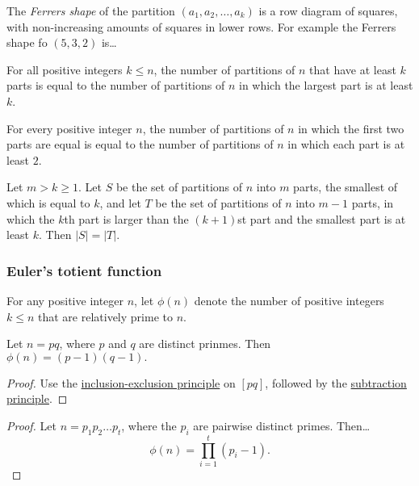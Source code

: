 The \emph{Ferrers shape} of the partition $(a_1,a_2,\dots,a_k)$ is a row diagram of squares, with non-increasing amounts of squares in lower rows. For example the Ferrers shape fo $(5,3,2)$ is\dots\newline



\begin{proposition}
For all positive integers $k \leq n$, the number of partitions of $n$ that have at least $k$ parts is equal to the number
of partitions of $n$ in which the largest part is at least $k$.
\end{proposition}

\begin{proposition}
For every positive integer $n$, the number of partitions of $n$ in which the first two parts are equal is equal to the number of partitions of $n$ 
in which each part is at least $2$.
\end{proposition}

\begin{lemma}
Let $m > k \geq 1$. Let $S$ be the set of partitions of $n$ into $m$ parts, the smallest of which is equal to $k$, and let $T$ be the set of partitions of 
$n$ into $m-1$ parts, in which the $k$th part is larger than the $(k+1)$st part and the smallest part is at least $k$.
Then $|S| = |T|$.
\end{lemma}

\subsubsection{Euler's totient function}\label{combinatoricstotient}

For any positive integer $n$, let $\phi(n)$ denote the number of positive integers $k \leq n$ that are relatively prime to $n$.

\begin{proposition}
Let $n = pq$, where $p$ and $q$ are distinct prinmes. Then $\phi(n) = (p-1)(q-1).$
\end{proposition}

\begin{proof}
Use the \hyperref[inclusionexclusion]{inclusion-exclusion principle} on $[pq]$, followed by the \hyperref[subtraction]{subtraction principle}.
\end{proof}

\begin{proof}
Let $n = p_1p_2\dots p_t$, where the $p_i$ are pairwise distinct primes. Then\dots
$$\phi(n) = \prod^t_{i=1}(p_i - 1).$$
\end{proof}

